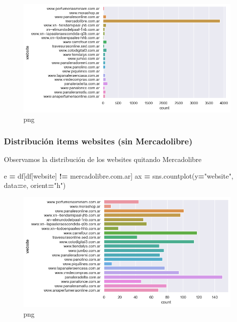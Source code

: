 \documentclass[
]{article}
\newenvironment{Shaded}{\begin{snugshade}}{\end{snugshade}}
\newcommand{\NormalTok}[1]{#1}
\newcommand{\OperatorTok}[1]{\textcolor[rgb]{0.81,0.36,0.00}{\textbf{#1}}}
\newcommand{\StringTok}[1]{\textcolor[rgb]{0.31,0.60,0.02}{#1}}
\begin{document}
\begin{figure}
\centering
\includegraphics{output_4_0.png}
\caption{png}
\end{figure}

\hypertarget{distribuciuxf3n-items-websites-sin-mercadolibre}{%
\subsubsection{Distribución items websites (sin
Mercadolibre)}\label{distribuciuxf3n-items-websites-sin-mercadolibre}}

Observamos la distribución de los websites quitando Mercadolibre

\begin{Shaded}
\begin{Highlighting}[]
\NormalTok{e }\OperatorTok{=}\NormalTok{ df[df[}\StringTok{\textquotesingle{}website\textquotesingle{}}\NormalTok{] }\OperatorTok{!=} \StringTok{\textquotesingle{}mercadolibre.com.ar\textquotesingle{}}\NormalTok{]}
\NormalTok{ax }\OperatorTok{=}\NormalTok{ sns.countplot(y}\OperatorTok{=}\StringTok{"website"}\NormalTok{, data}\OperatorTok{=}\NormalTok{e, orient}\OperatorTok{=}\StringTok{"h"}\NormalTok{)}
\end{Highlighting}
\end{Shaded}

\begin{figure}
\centering
\includegraphics{output_6_0.png}
\caption{png}
\end{figure}
\end{document}
